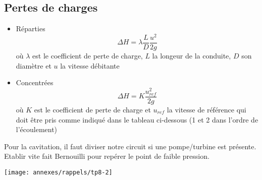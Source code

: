 \subsection*{Pertes de charges}
\begin{itemize}
	\item Réparties
	      \begin{equation}
	      	\Delta H = \lambda \frac{L}{D}\frac{u^2}{2g}
	      \end{equation}
	      où $\lambda$ est le coefficient de perte de charge, $L$ la longeur de la conduite, $D$ son diamètre et $u$ la vitesse débitante
	      	
	\item Concentrées
	      \begin{equation}
	      	\Delta H = K \frac{u^2_{ref}}{2g}
	      \end{equation}
	      où $K$ est le coefficient de perte de charge et $u_{ref}$ la vitesse de référence qui doit être pris comme indiqué dans le tableau ci-dessous (1 et 2 dans l'ordre de l'écoulement)
\end{itemize}	
Pour la cavitation, il faut diviser notre circuit si une pompe/turbine est présente. Etablir vite fait Bernouilli pour repérer le point de faible pression. \\

\begin{center}
	\texttt{[image: annexes/rappels/tp8-2]}
\end{center}
